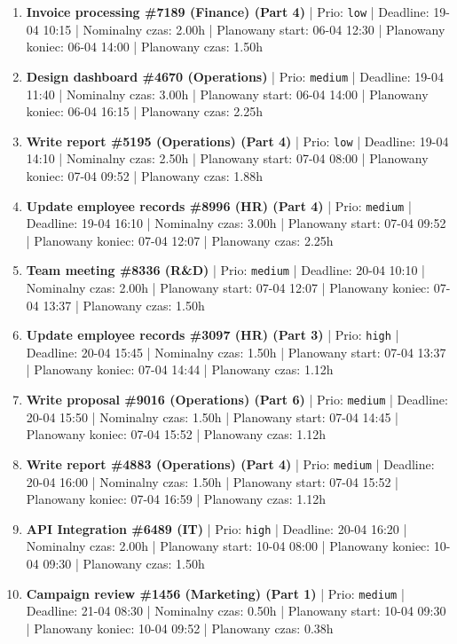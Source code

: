 {\begin{enumerate}
  \item [\textbf{14678}] \textbf{Invoice processing \#7189 (Finance) (Part 4)} | Prio: \texttt{low} | Deadline: 19-04 10:15 | Nominalny czas: 2.00h | Planowany start: 06-04 12:30 | Planowany koniec: 06-04 14:00 | Planowany czas: 1.50h
  \item [\textbf{14676}] \textbf{Design dashboard \#4670 (Operations)} | Prio: \texttt{medium} | Deadline: 19-04 11:40 | Nominalny czas: 3.00h | Planowany start: 06-04 14:00 | Planowany koniec: 06-04 16:15 | Planowany czas: 2.25h
  \item [\textbf{14687}] \textbf{Write report \#5195 (Operations) (Part 4)} | Prio: \texttt{low} | Deadline: 19-04 14:10 | Nominalny czas: 2.50h | Planowany start: 07-04 08:00 | Planowany koniec: 07-04 09:52 | Planowany czas: 1.88h
  \item [\textbf{14655}] \textbf{Update employee records \#8996 (HR) (Part 4)} | Prio: \texttt{medium} | Deadline: 19-04 16:10 | Nominalny czas: 3.00h | Planowany start: 07-04 09:52 | Planowany koniec: 07-04 12:07 | Planowany czas: 2.25h
  \item [\textbf{14649}] \textbf{Team meeting \#8336 (R\&D)} | Prio: \texttt{medium} | Deadline: 20-04 10:10 | Nominalny czas: 2.00h | Planowany start: 07-04 12:07 | Planowany koniec: 07-04 13:37 | Planowany czas: 1.50h
  \item [\textbf{14621}] \textbf{Update employee records \#3097 (HR) (Part 3)} | Prio: \texttt{high} | Deadline: 20-04 15:45 | Nominalny czas: 1.50h | Planowany start: 07-04 13:37 | Planowany koniec: 07-04 14:44 | Planowany czas: 1.12h
  \item [\textbf{14662}] \textbf{Write proposal \#9016 (Operations) (Part 6)} | Prio: \texttt{medium} | Deadline: 20-04 15:50 | Nominalny czas: 1.50h | Planowany start: 07-04 14:45 | Planowany koniec: 07-04 15:52 | Planowany czas: 1.12h
  \item [\textbf{14651}] \textbf{Write report \#4883 (Operations) (Part 4)} | Prio: \texttt{medium} | Deadline: 20-04 16:00 | Nominalny czas: 1.50h | Planowany start: 07-04 15:52 | Planowany koniec: 07-04 16:59 | Planowany czas: 1.12h
  \item [\textbf{14620}] \textbf{API Integration \#6489 (IT)} | Prio: \texttt{high} | Deadline: 20-04 16:20 | Nominalny czas: 2.00h | Planowany start: 10-04 08:00 | Planowany koniec: 10-04 09:30 | Planowany czas: 1.50h
  \item [\textbf{14653}] \textbf{Campaign review \#1456 (Marketing) (Part 1)} | Prio: \texttt{medium} | Deadline: 21-04 08:30 | Nominalny czas: 0.50h | Planowany start: 10-04 09:30 | Planowany koniec: 10-04 09:52 | Planowany czas: 0.38h

\end{enumerate}}
